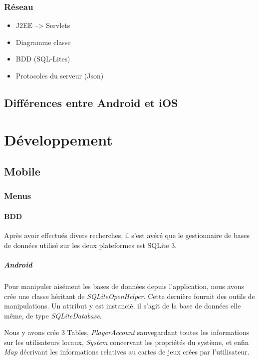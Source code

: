\documentclass[]{report}
\begin{document}
		\subsection{Réseau}
			\begin{itemize}
				\item{J2EE --> Servlets}
				\item{Diagramme classe}
				\item{BDD (SQL-Lites)}
				\item{Protocoles du serveur (Json)}
			\end{itemize}
			
	\section{Différences entre Android et iOS}
	


\chapter{Développement}
	\section{Mobile}
		\subsection{Menus}
			\subsubsection{BDD}
			Après avoir effectués divers recherches, il s'est avéré que le gestionnaire
			de bases de données utilisé sur les deux plateformes est SQLite 3. 
			
			\paragraph{Android\\}
			
			Pour manipuler aisément les bases de données depuis l'application,
			nous avons crée une classe héritant de \textit{SQLiteOpenHelper}. Cette
			dernière fournit des outils de manipulations. Un attribut y est
			instancié, il s'agit de la base de données elle même, de type
			\textit{SQLiteDatabase}.
			
			Nous y avons crée 3 Tables, \textit{PlayerAccount} sauvegardant toutes les
			informations sur les utilisateurs locaux, \textit{System} concervant les
			propriétés du système, et enfin \textit{Map} décrivant les informations
			relatives au cartes de jeux crées par l'utilisateur.
			
\end{document}
